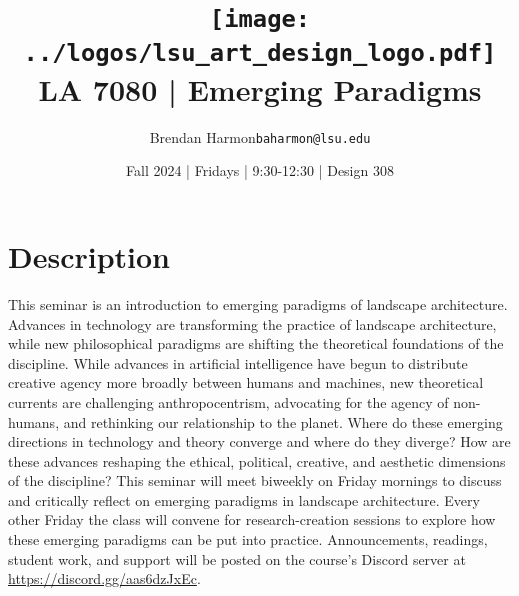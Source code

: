 \documentclass[11pt,article,oneside]{memoir}
\makeatletter
\def\myauthor{Author}
\def\mytitle{Title}
\def\myemail{baharmon@lsu.edu}
\def\myauthor{Brendan Harmon}
\def\mytitle{ \texttt{[image: ../logos/lsu\_art\_design\_logo.pdf]} \\[0.1cm] {\normalfont \normalsize LA 7080 |} \Large Emerging Paradigms}
\newcommand{\globalcolor}[1]{%
  \color{#1}\global\let\default@color\current@color
}
\makeatother
\begin{document}
\setlength\bibitemsep{0.5em}
\setmainfont{IBM Plex Sans}
\setmonofont[Scale=0.8]{IBM Plex Mono}

\def\ind{\hangindent=1 true cm\hangafter=1 \noindent}
\def\labelitemi{$\cdot$}

\title{\LARGE \mytitle}
\author{\Large\myauthor \newline \footnotesize\texttt{\noindent\myemail}}
\date{Fall 2024 | Fridays | 9:30-12:30 | Design 308}
\published{\,}


\globalcolor{black}

\vspace*{-10em}
\maketitle

\vspace*{-2em}
\section{Description}
This seminar is an introduction to 
emerging paradigms of landscape architecture.
Advances in technology are transforming 
the practice of landscape architecture,
while new philosophical paradigms 
are shifting the theoretical foundations of the discipline. 
While advances in artificial intelligence 
have begun to distribute creative agency
more broadly between humans and machines,
new theoretical currents are 
challenging anthropocentrism,
advocating for the agency of non-humans, 
and rethinking our relationship to the planet. 
Where do these emerging directions
in technology and theory converge
and where do they diverge? 
How are these advances reshaping
the ethical, political, creative, and aesthetic dimensions 
of the discipline? 
This seminar will meet biweekly 
on Friday mornings to 
discuss and critically reflect on emerging paradigms
in landscape architecture. 
Every other Friday
the class will convene for 
research-creation sessions to explore
how these emerging paradigms 
can be put into practice. 
Announcements, readings, student work, and support
will be posted on the course's Discord server at 
\url{https://discord.gg/aas6dzJxEc}.

\end{document}
